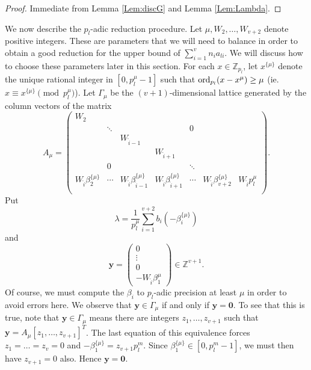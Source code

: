 \begin{proof}
Immediate from Lemma \ref{Lem:discG} and Lemma \ref{Lem:Lambda}. 
\end{proof}

We now describe the $p_l$-adic reduction procedure. Let $\mu, W_2, \dots, W_{v+2}$ denote positive integers. These are parameters that we will need to balance in order to obtain a good reduction for the upper bound of 
$\sum_{i = 1}^v n_{i}a_{li}$. We will discuss how to choose these parameters later in this section. For each $x \in \mathbb{Z}_{p_l}$, let $x^{\{\mu\}}$ denote the unique rational integer in $[0,p_l^{\mu} - 1]$ such that $\operatorname{ord}_{p_l}(x - x^{\mu}) \geq \mu$ (ie. $x \equiv x^{\{\mu\}} \pmod{p_l^{\mu}}$). Let $\Gamma_{\mu}$ be the $(v+1)$-dimensional lattice generated by the column vectors of the matrix
\[A_{\mu} = 
\begin{pmatrix}
W_2 & 		&				&				&		&	&	\\
	& \ddots	& 				&				& 0		& 	&	\\
	&		& W_{\hat{i} - 1}	&				&		&	&	\\
	& 		& 				& W_{\hat{i} + 1}	&		&	&	\\	
	& 0		& 				& 				&\ddots	&	&	\\
W_{\hat{i}}\beta_2^{\{\mu\}}& \cdots & W_{\hat{i}}\beta_{\hat{i} - 1}^{\{\mu\}} & W_{\hat{i}}\beta_{\hat{i} + 1}^{\{\mu\}}& \cdots &W_{\hat{i}}\beta_{v+2}^{\{\mu\}}& W_{\hat{i}}p_l^{\mu}\\	
\end{pmatrix}.\]
Put
\[ \lambda = \frac{1}{p_l^{\mu}} \sum_{i = 1}^{v+2} b_i\left(-\beta_i^{\{\mu\}}\right)\]
and
\[\mathbf{y} = 
\begin{pmatrix}
0 \\
\vdots \\
0 \\
-W_{\hat{i}}\beta_1^{\mu}
\end{pmatrix}
\in \mathbb{Z}^{v+1}.\]
Of course, we must compute the $\beta_i$ to $p_l$-adic precision at least $\mu$ in order to avoid errors here. We observe that $\mathbf{y} \in \Gamma_{\mu}$ if and only if $\mathbf{y}= \mathbf{0}$. To see that this is true, note that $\mathbf{y} \in \Gamma_{\mu}$ means there are integers $z_1, \dots, z_{v+1}$ such that $\mathbf{y}=A_{\mu}[z_1, \dots, z_{v+1}]^{T}$. The last equation of this equivalence forces $z_1 = \dots = z_{v} = 0$ and $-\beta_1^{\{\mu\}} = z_{v+1}p_l^{m}$. Since $\beta_1^{\{\mu\}} \in [0, p_l^m - 1]$, we must then have $z_{v+1} = 0$ also. Hence $\mathbf{y} = \mathbf{0}$. 

